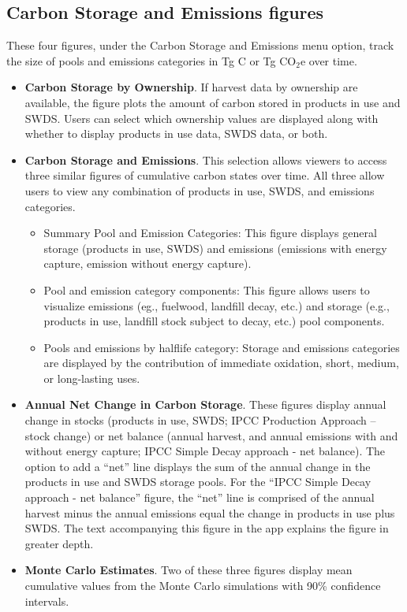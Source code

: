 \documentclass[
  openany]{book}
\providecommand{\tightlist}{%
  \setlength{\itemsep}{0pt}\setlength{\parskip}{0pt}}
\begin{document}
\hypertarget{app-shiny-cse}{%
\subsection{Carbon Storage and Emissions figures}\label{app-shiny-cse}}

These four figures, under the Carbon Storage and Emissions menu option, track the size of pools and emissions categories in Tg C or Tg CO\(_2\)e over time.

\begin{itemize}
\item
  \textbf{Carbon Storage by Ownership}. If harvest data by ownership are available, the figure plots the amount of carbon stored in products in use and SWDS. Users can select which ownership values are displayed along with whether to display products in use data, SWDS data, or both.\\
\item
  \textbf{Carbon Storage and Emissions}. This selection allows viewers to access three similar figures of cumulative carbon states over time. All three allow users to view any combination of products in use, SWDS, and emissions categories.

  \begin{itemize}
  \tightlist
  \item
    Summary Pool and Emission Categories: This figure displays general storage (products in use, SWDS) and emissions (emissions with energy capture, emission without energy capture).
  \item
    Pool and emission category components: This figure allows users to visualize emissions (eg., fuelwood, landfill decay, etc.) and storage (e.g., products in use, landfill stock subject to decay, etc.) pool components.
  \item
    Pools and emissions by halflife category: Storage and emissions categories are displayed by the contribution of immediate oxidation, short, medium, or long-lasting uses.\\
  \end{itemize}
\item
  \textbf{Annual Net Change in Carbon Storage}. These figures display annual change in stocks (products in use, SWDS; IPCC Production Approach -- stock change) or net balance (annual harvest, and annual emissions with and without energy capture; IPCC Simple Decay approach - net balance). The option to add a ``net'' line displays the sum of the annual change in the products in use and SWDS storage pools. For the ``IPCC Simple Decay approach - net balance'' figure, the ``net'' line is comprised of the annual harvest minus the annual emissions equal the change in products in use plus SWDS. The text accompanying this figure in the app explains the figure in greater depth.
\item
  \textbf{Monte Carlo Estimates}. Two of these three figures display mean cumulative values from the Monte Carlo simulations with 90\% confidence intervals.


\end{itemize}
\end{document}
